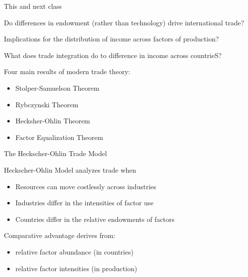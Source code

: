 \documentclass[notes,11pt, aspectratio=169, xcolor=table]{beamer}
\newenvironment{wideitemize}{\itemize\addtolength{\itemsep}{10pt}}{\enditemize}
\begin{document}
\begin{frame}{This and next class}
\begin{wideitemize}
    \item Do differences in endowment (rather than technology) drive international trade?
    \item Implications for the distribution of income across factors of production?
    \item What does trade integration do to difference in income across countrieS?
    \item Four main results of modern trade theory:
    \begin{itemize}
        \item Stolper-Samuelson Theorem
        \item Rybczynski Theorem
        \item Hecksher-Ohlin Theorem
        \item Factor Equalization Theorem
    \end{itemize}
\end{wideitemize}
\end{frame}


\begin{frame}{The Heckscher-Ohlin Trade Model}
    \begin{wideitemize}
        \item Heckscher-Ohlin Model analyzes trade when
        \begin{itemize}
            \item Resources can move costlessly across industries
            \item Industries differ in the intensities of factor use
            \item Countries differ in the relative endowments of factors
        \end{itemize}
    \item  Comparative advantage derives from:
    \begin{itemize}
        \item relative factor abundance (in countries)
        \item relative factor intensities (in production)
    \end{itemize} 
    \end{wideitemize}    
\end{frame}
\end{document}
